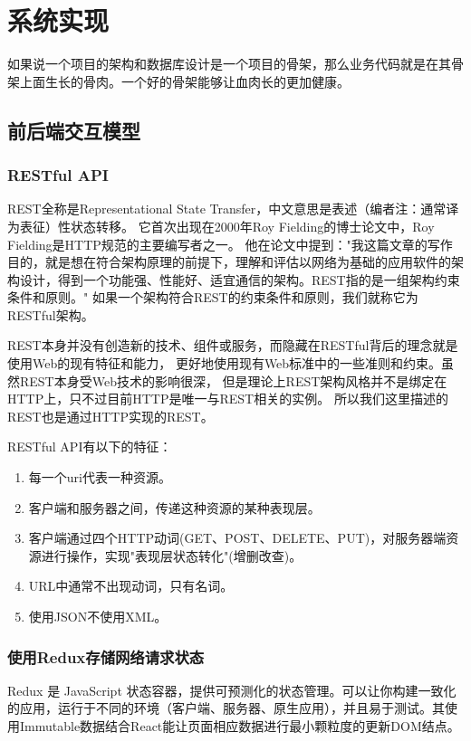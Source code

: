 \section{系统实现}

如果说一个项目的架构和数据库设计是一个项目的骨架，那么业务代码就是在其骨架上面生长的骨肉。一个好的骨架能够让血肉长的更加健康。

\subsection{前后端交互模型}

\subsubsection{RESTful API}

REST全称是Representational State Transfer，中文意思是表述（编者注：通常译为表征）性状态转移。 它首次出现在2000年Roy Fielding的博士论文中，Roy Fielding是HTTP规范的主要编写者之一。 他在论文中提到："我这篇文章的写作目的，就是想在符合架构原理的前提下，理解和评估以网络为基础的应用软件的架构设计，得到一个功能强、性能好、适宜通信的架构。REST指的是一组架构约束条件和原则。" 如果一个架构符合REST的约束条件和原则，我们就称它为RESTful架构。

REST本身并没有创造新的技术、组件或服务，而隐藏在RESTful背后的理念就是使用Web的现有特征和能力， 更好地使用现有Web标准中的一些准则和约束。虽然REST本身受Web技术的影响很深， 但是理论上REST架构风格并不是绑定在HTTP上，只不过目前HTTP是唯一与REST相关的实例。 所以我们这里描述的REST也是通过HTTP实现的REST。

RESTful API有以下的特征：

\begin{enumerate}
	\item 每一个uri代表一种资源。
	\item 客户端和服务器之间，传递这种资源的某种表现层。
	\item 客户端通过四个HTTP动词(GET、POST、DELETE、PUT)，对服务器端资源进行操作，实现"表现层状态转化"(增删改查)。
	\item URL中通常不出现动词，只有名词。
	\item 使用JSON不使用XML。
\end{enumerate}

\subsubsection{使用Redux存储网络请求状态}

Redux 是 JavaScript 状态容器，提供可预测化的状态管理。可以让你构建一致化的应用，运行于不同的环境（客户端、服务器、原生应用），并且易于测试。其使用Immutable数据结合React能让页面相应数据进行最小颗粒度的更新DOM结点。

